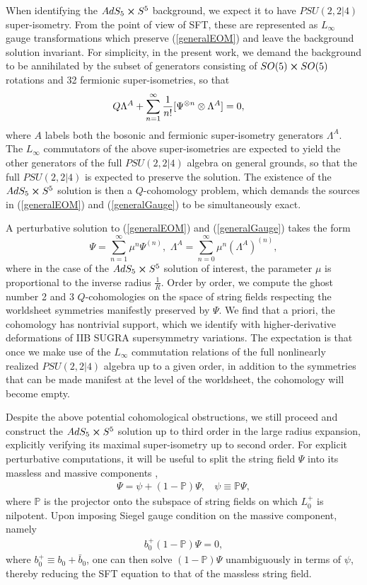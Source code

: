 \documentclass[12pt]{article}
\def\be{\begin{equation}}
\def\ee{\end{equation}}
\def\ie{\begin{equation}\begin{aligned}}
\def\fe{\end{aligned}\end{equation}}
\numberwithin{equation}{section}
\begin{document}
When identifying the $AdS_5 \cross S^5$ background, we expect it to have $PSU(2,2|4)$ super-isometry. From the point of view of SFT, these are represented as $L_\infty$ gauge transformations which preserve (\ref{generalEOM}) and leave the background solution invariant. For simplicity, in the present work, we demand the background to be annihilated by the subset of generators consisting of $SO(5) \cross SO(5)$ rotations and 32 fermionic super-isometries, so that
\ie{}
& Q \Lambda^A + \sum_{n=1}^\infty {1\over n!} [\Psi^{\otimes n}\otimes \Lambda^A] = 0,
\label{generalGauge}
\fe
where $A$ labels both the bosonic and fermionic super-isometry generators $\Lambda^A$. The $L_\infty$ commutators of the above super-isometries are expected to yield the other generators of the full $PSU(2,2|4)$ algebra on general grounds, so that the full $PSU(2,2|4)$ is expected to preserve the solution. The existence of the $AdS_5 \cross S^5$ solution is then a $Q$-cohomology problem, which demands the sources in (\ref{generalEOM}) and (\ref{generalGauge}) to be simultaneously exact.

A perturbative solution to (\ref{generalEOM}) and (\ref{generalGauge}) takes the form
\be \label{pertExp}
\Psi = \sum_{n=1}^\infty \mu^n \Psi^{(n)}, \,\, \Lambda^A = \sum_{n=0}^\infty \mu^n (\Lambda^A)^{(n)},
\ee
where in the case of the $AdS_5 \cross S^5$ solution of interest, the parameter $\mu$ is proportional to the inverse radius $\frac{1}{R}$. Order by order, we compute the ghost number 2 and 3 $Q$-cohomologies on the space of string fields respecting the worldsheet symmetries manifestly preserved by $\Psi$. We find that a priori, the cohomology has nontrivial support, which we identify with higher-derivative deformations of IIB SUGRA supersymmetry variations. The expectation is that once we make use of the $L_\infty$ commutation relations of the full nonlinearly realized $PSU(2,2|4)$ algebra up to a given order, in addition to the symmetries that can be made manifest at the level of the worldsheet, the cohomology will become empty.

Despite the above potential cohomological obstructions, we still proceed and construct the $AdS_5 \cross S^5$ solution up to third order in the large radius expansion, explicitly verifying its maximal super-isometry up to second order.
For explicit perturbative computations, it will be useful to split the string field $\Psi$ into its massless and massive components \cite{Erbin:2020eyc},
\ie{}
\Psi = \psi + (1-\mathbb{P})\Psi,~~~~ \psi \equiv \mathbb{P} \Psi,
\fe
where $\mathbb{P}$ is the projector onto the subspace of string fields on which $L_0^+$ is nilpotent. Upon imposing Siegel gauge condition on the massive component, namely
\ie\label{masssiegel}
b_0^+(1-\mathbb{P})\Psi=0,
\fe
where $b_0^+\equiv b_0 + \bar b_0$, one can then solve $(1-\mathbb{P})\Psi$ unambiguously in terms of $\psi$, thereby reducing the SFT equation to that of the massless string field.
\end{document}
